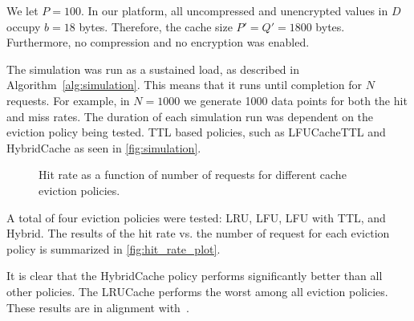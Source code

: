 We let $P = 100$.
In our platform, all uncompressed and unencrypted
values in $D$ occupy $b = 18$ bytes.
Therefore, the cache size $P' = Q' = 1800$ bytes.
Furthermore, no compression and no encryption
was enabled.

The simulation was run as a sustained load,
as described in Algorithm~\ref{alg:simulation}.
This means that it runs until completion
for
$N$ requests. For example, in $N=1000$
we generate 1000 data points for both
the hit and miss rates. The duration
of each simulation run was dependent
on the eviction policy being tested.
TTL based policies, such as LFUCacheTTL
and HybridCache as seen in \autoref{fig:simulation}.

\begin{figure}[!htp]
    \centering
    \caption{Hit rate as a function of number of requests for different cache eviction policies.}
    \label{fig:hit_rate_plot}
\end{figure}

A total of four eviction policies were tested:
LRU, LFU, LFU with TTL, and Hybrid.
The results of the hit rate vs. the number
of request for each eviction policy is summarized
in \autoref{fig:hit_rate_plot}.

It is clear that the HybridCache policy performs significantly
better than all other policies. The LRUCache performs the worst
among all eviction policies. These results
are in alignment with~\cite{shah2023ImprovedCacheEviction}.